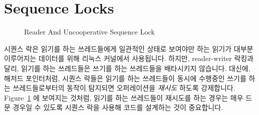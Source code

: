 
\section{Sequence Locks}
\label{sec:defer:Sequence Locks}

\begin{figure}[tb]
\begin{center}
\end{center}
\caption{Reader And Uncooperative Sequence Lock}
\label{fig:defer:Reader And Uncooperative Sequence Lock}
\end{figure}

시퀀스 락은 읽기를 하는 쓰레드들에게 일관적인 상태로 보여야만 하는 읽기가
대부분 이루어지는 데이터를 위해 리눅스 커널에서 사용됩니다.
하지만, reader-writer 락킹과 달리, 읽기를 하는 쓰레드들은 쓰기를 하는
쓰레드들을 배타시키지 않습니다.
대신에, 해저드 포인터처럼, 시퀀스 락들은 읽기를 하는 쓰레드들이 동시에 수행중인
쓰기를 하는 쓰레드들로부터의 동작이 탐지되면 오퍼레이션을 \emph{재시도} 하도록
강제합니다.
Figure~\ref{fig:defer:Reader And Uncooperative Sequence Lock} 에 보여지는
것처럼, 읽기를 하는 쓰레드들이 재시도를 하는 경우는 매우 드문 경우일 수 있도록
시퀀스 락을 사용해 코드를 설계하는 것이 중요합니다.

